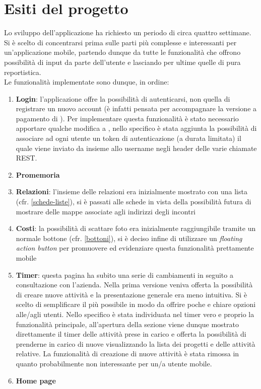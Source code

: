 \section{Esiti del progetto}

Lo sviluppo dell'applicazione ha richiesto un periodo di circa quattro settimane.
Si è scelto di concentrarsi prima sulle parti più complesse e interessanti per
un'applicazione mobile, partendo dunque da tutte le funzionalità che offrono possibilità
di input da parte dell'utente e lasciando per ultime quelle di pura reportistica. \\

Le funzionalità implementate sono dunque, in ordine:

\begin{enumerate}
\item \textbf{Login}: l'applicazione offre la possibilità di autenticarsi, non quella
di registrare un nuovo account (è infatti pensata per accompagnare la versione a
pagamento di \fiscoloWeb). Per implementare questa funzionalità è stato necessario
apportare qualche modifica a \fiscoloWeb{}, nello specifico è stata aggiunta la possibilità
di associare ad ogni utente un token di autenticazione (a durata limitata) il quale viene
inviato da \fiscoloMobile{} insieme allo username negli header delle varie chiamate REST.
\item \textbf{Promemoria}
\item \textbf{Relazioni}: l'insieme delle relazioni era inizialmente mostrato con una
lista (cfr. \ref{schede-liste}), si è passati alle schede in vista della possibilità
futura di mostrare delle mappe associate agli indirizzi degli incontri
\item \textbf{Costi}: la possibilità di scattare foto era inizialmente raggiungibile tramite
un normale bottone (cfr. \ref{bottoni}), si è deciso infine di utilizzare un
\textit{floating action button} per promuovere ed evidenziare questa funzionalità
prettamente mobile
\item \textbf{Timer}: questa pagina ha subito una serie di cambiamenti in seguito a
consultazione con l'azienda. Nella prima versione veniva offerta la possibilità di creare
nuove attività e la presentazione generale era meno intuitiva. Si è scelto di semplificare
il più possibile in modo da offrire poche e chiare opzioni alle/agli utenti. Nello specifico
è stata individuata nel timer vero e proprio la funzionalità principale, all'apertura della
sezione viene dunque mostrato direttamente il timer delle attività prese in carico e offerta
la possibilità di prenderne in carico di nuove visualizzando la lista dei progetti e delle
attività relative. La funzionalità di creazione di nuove attività è stata rimossa in quanto
probabilmente non interessante per un/a utente mobile.
\item \textbf{Home page}
\end{enumerate}


